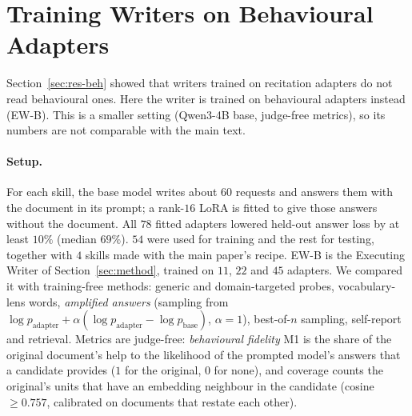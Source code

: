 \documentclass[11pt]{article}
\newcommand{\EWB}{\textsc{EW-B}}
\begin{document}
\section{Training Writers on Behavioural Adapters}
\label{app:ewb}

Section~\ref{sec:res-beh} showed that writers trained on recitation adapters do not read behavioural ones. Here the writer is trained on
behavioural adapters instead (\EWB{}). This is a smaller setting (Qwen3-4B base, judge-free metrics), so its numbers are not comparable with the main text.

\paragraph{Setup.} For each skill, the base model writes about $60$ requests and answers them with the document in its prompt; a rank-$16$ LoRA is fitted
to give those answers without the document. All $78$ fitted adapters lowered held-out answer loss by at least $10\%$ (median $69\%$). $54$ were used for
training and the rest for testing, together with $4$ skills made with the main paper's recipe. \EWB{} is the Executing Writer of Section~\ref{sec:method},
trained on $11$, $22$ and $45$ adapters. We compared it with training-free methods: generic and domain-targeted probes, vocabulary-lens words,
\emph{amplified answers} (sampling from $\log p_{\text{adapter}}+\alpha(\log p_{\text{adapter}}-\log p_{\text{base}})$, $\alpha=1$), best-of-$n$ sampling,
self-report and retrieval. Metrics are judge-free: \emph{behavioural fidelity} M1 is the share of the original document's help to the likelihood of
the prompted model's answers that a candidate provides ($1$ for the original, $0$ for none), and coverage counts the original's units that have an
embedding neighbour in the candidate (cosine $\ge0.757$, calibrated on documents that restate each other).
\end{document}
